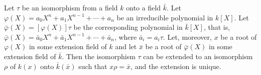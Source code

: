 Let $\tau$ be an isomorphism from a field $k$ onto a field $\bar{k}$. Let $\varphi(X) = a_0 X^n + a_1 X^{n-1} + \cdots + a_n$ be an irreducible polynomial in $k[X]$. Let $\bar{\varphi}(X) = [\varphi(X)]\tau$ be the corresponding polynomial in $\bar{k}[X]$, that is, $\bar{\varphi}(X) = \bar{a}_0 X^n + \bar{a}_1 X^{n-1} + \cdots + \bar{a}_n$, where $\bar{a}_i = a_i\tau$. Let, moreover, $x$ be a root of $\varphi(X)$ in some extension field of $k$ and let $\bar{x}$ be a root of $\bar{\varphi}(X)$ in some extension field of $\bar{k}$. Then the isomorphism $\tau$ can be extended to an isomorphism $\rho$ of $k(x)$ onto $\bar{k}(\bar{x})$ such that $x\rho = \bar{x}$, and the extension is unique.
